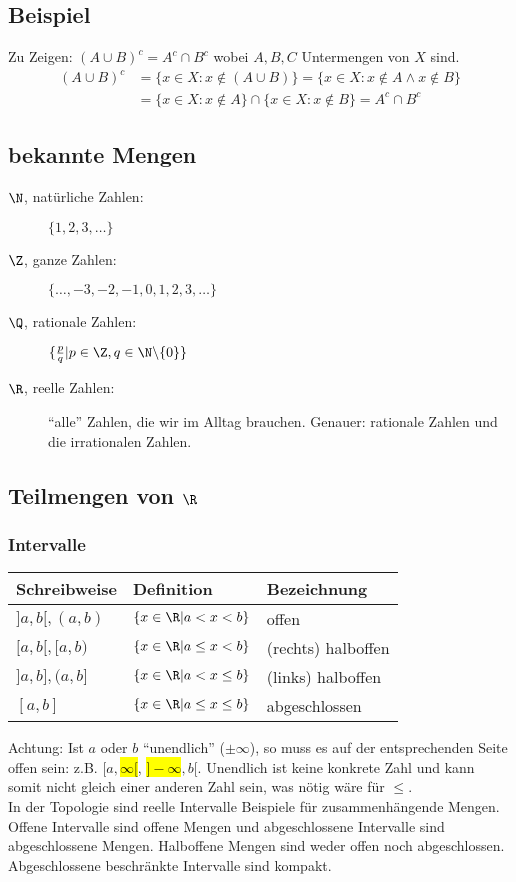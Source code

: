 \subsection{Beispiel}
Zu Zeigen: $(A \cup B)^c = A^c \cap B^c$ wobei $A, B, C$ Untermengen von $X$ sind.
\begin{align*}
(A \cup B)^c &= \{x \in X: x \not\in (A \cup B)\} = \{x \in X: x \not\in A \land x \not\in B\}\\
&= \{x \in X: x \not\in A\} \cap \{x \in X: x \not\in B\} = A^c \cap B^c
\end{align*}

\subsection{bekannte Mengen}
\begin{description}
	\item[$\N$, natürliche Zahlen:] $\{1, 2, 3, \ldots\}$
	\item[$\Z$, ganze Zahlen:] $\{\ldots, -3, -2, -1, 0, 1, 2, 3, \ldots\}$
	\item[$\Q$, rationale Zahlen:] $\{\frac{p}{q} | p \in \Z, q \in \N \backslash \{0\}\}$
	\item[$\R$, reelle Zahlen:] ``alle'' Zahlen, die wir im Alltag brauchen. Genauer: rationale Zahlen und die irrationalen Zahlen.
\end{description}

\subsection{Teilmengen von $\R$}
\subsubsection{Intervalle}
\begin{tabular}{|l|l|l|}\hline
Schreibweise & Definition & Bezeichnung\\\hline
$]a, b[, (a,b)$ & $\{x \in \R | a < x < b\}$ & offen\\\hline
$[a, b[, [a, b)$ & $\{x \in \R | a \leq x < b\}$ & (rechts) halboffen \\\hline
$]a,b], (a, b]$ & $\{x \in \R | a < x \leq b\}$ & (links) halboffen \\\hline
$[a,b]$ & $\{x \in \R | a \leq x \leq b\}$ & abgeschlossen \\\hline
\end{tabular}

Achtung: Ist $a$ oder $b$ ``unendlich'' ($\pm \infty$), so muss es auf der entsprechenden Seite offen sein: z.B. $[a, $\hl{$\infty[$}, \hl{$]-\infty$}$, b[$.
Unendlich ist keine konkrete Zahl und kann somit nicht gleich einer anderen Zahl sein, was nötig wäre für $\leq$. \\
In der Topologie sind reelle Intervalle Beispiele für zusammenhängende Mengen. Offene Intervalle sind offene Mengen und abgeschlossene Intervalle sind abgeschlossene Mengen. Halboffene Mengen sind weder offen noch abgeschlossen. Abgeschlossene beschränkte Intervalle sind kompakt.

